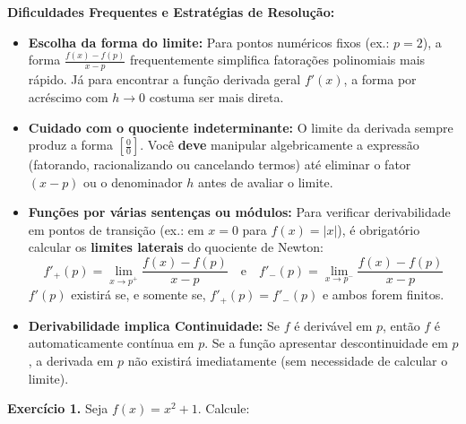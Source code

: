 \documentclass[12pt,a4paper]{article}
\begin{document}
\begin{dicasbox}
\textbf{Dificuldades Frequentes e Estratégias de Resolução:}
\begin{itemize}[noitemsep, topsep=2pt]
    \item \textbf{Escolha da forma do limite:} Para pontos numéricos fixos (ex.: $p = 2$), a forma $\frac{f(x) - f(p)}{x - p}$ frequentemente simplifica fatorações polinomiais mais rápido. Já para encontrar a função derivada geral $f'(x)$, a forma por acréscimo com $h \to 0$ costuma ser mais direta.
    \item \textbf{Cuidado com o quociente indeterminante:} O limite da derivada sempre produz a forma $\left[\frac{0}{0}\right]$. Você \textbf{deve} manipular algebricamente a expressão (fatorando, racionalizando ou cancelando termos) até eliminar o fator $(x - p)$ ou o denominador $h$ antes de avaliar o limite.
    \item \textbf{Funções por várias sentenças ou módulos:} Para verificar derivabilidade em pontos de transição (ex.: em $x = 0$ para $f(x) = |x|$), é obrigatório calcular os \textbf{limites laterais} do quociente de Newton:
    \[
    f'_+(p) = \lim_{x \to p^+} \frac{f(x) - f(p)}{x - p} \quad \text{e} \quad f'_-(p) = \lim_{x \to p^-} \frac{f(x) - f(p)}{x - p}
    \]
    $f'(p)$ existirá se, e somente se, $f'_+(p) = f'_-(p)$ e ambos forem finitos.
    \item \textbf{Derivabilidade implica Continuidade:} Se $f$ é derivável em $p$, então $f$ é automaticamente contínua em $p$. Se a função apresentar descontinuidade em $p$, a derivada em $p$ não existirá imediatamente (sem necessidade de calcular o limite).
\end{itemize}
\end{dicasbox}
\vspace{0.5cm}

\vspace{0.5cm}
\noindent\textbf{Exercício 1.} Seja $f(x) = x^2 + 1$. Calcule:
\end{document}
